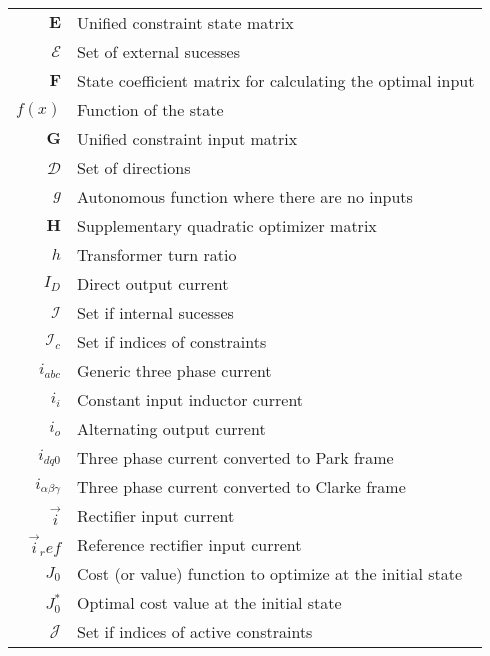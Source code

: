 \begin{scriptsize}
\begin{tabularx}{\textwidth}{r|X}
$\textbf{E}$                & Unified constraint state matrix \\
$\mathcal{E}$               & Set of external sucesses\\

$\textbf{F}$                & State coefficient matrix for calculating the optimal input \\
$f(x)$														& Function of the state\\

$\textbf{G}$                & Unified constraint input matrix \\
$\mathcal{D}$               & Set of directions\\
$g$                         & Autonomous function where there are no inputs\\

$\textbf{H}$                & Supplementary quadratic optimizer matrix\\
$h$                                                             & Transformer turn ratio\\

$I_D$															& Direct output current\\
$\mathcal{I}$               & Set if internal sucesses\\
$\mathcal{I}_c$               & Set if indices of constraints\\
$i_{abc}$                   & Generic three phase current\\
$i_i$															& Constant input inductor current\\
$i_o$															& Alternating output current\\
$i_{dq0}$                   & Three phase current converted to Park frame\\
$i_{\alpha\beta\gamma}$                   & Three phase current converted to Clarke frame\\
$\vec{i}$													& Rectifier input current\\
$\vec{i}_ref$											& Reference rectifier input current\\


$J_0$                           & Cost (or value) function to optimize at the initial state\\
$J^*_0$            & Optimal cost value at the initial state\\
$\mathcal{J}$               & Set if indices of active constraints\\


\end{tabularx}
\end{scriptsize}
